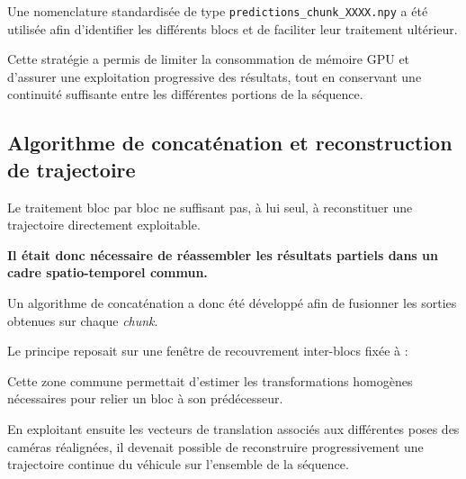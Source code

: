 \documentclass[12pt,a4paper,oneside]{report}
\newcommand{\textsb}[1]{{\fontseries{sb}\selectfont #1}}
\begin{document}
\hspace*{1cm}Une nomenclature standardisée de type \texttt{predictions\_chunk\_XXXX.npy} a été utilisée afin d'identifier les différents blocs et de faciliter leur traitement ultérieur.\vspace{0.05cm}

\hspace*{.5cm}Cette stratégie a permis de limiter la consommation de mémoire GPU et d'assurer une exploitation progressive des résultats, tout en conservant une continuité suffisante entre les différentes portions de la séquence.

\vspace{0.cm}

\subsection{Algorithme de concaténation et reconstruction de trajectoire}

\hspace*{1cm}Le traitement bloc par bloc ne suffisant pas, à lui seul, à reconstituer une trajectoire directement exploitable.\vspace{0.05cm}

\textbf{\hspace*{1cm}Il était donc nécessaire de réassembler les résultats partiels dans un cadre spatio-temporel commun.\vspace{0.1cm}}

\hspace*{1cm}Un algorithme de concaténation a donc été développé afin de fusionner les sorties obtenues sur chaque \textit{chunk}.\vspace{0.05cm}

\hspace{1cm}Le principe reposait sur une fenêtre de recouvrement inter-blocs fixée à : \\ 
\vspace{0.03cm}
\noindent\makebox[\textwidth][c]{\textsb{n\_overlap = 3}}

\vspace{0.2cm}

\hspace*{1cm}Cette zone commune permettait d'estimer les transformations homogènes nécessaires pour relier un bloc à son prédécesseur.\vspace{0.05cm}

\hspace*{.5cm}En exploitant ensuite les vecteurs de translation associés aux différentes poses des caméras réalignées, il devenait possible de reconstruire progressivement une trajectoire continue du véhicule sur l'ensemble de la séquence.
\end{document}
